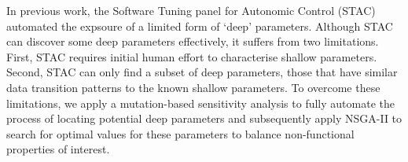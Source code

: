 In previous work, the Software Tuning panel for Autonomic Control 
(STAC)~\cite{Brake:2008:ADS:1370018.1370031} automated the expsoure of a
limited form of `deep' parameters. 
Although STAC
can discover some deep parameters effectively, it suffers from two
limitations. First, STAC requires initial human effort to characterise
shallow parameters. Second, STAC can only find a subset of deep parameters,
those that have similar data transition patterns to the known shallow
parameters. To overcome these limitations, we apply a mutation-based
sensitivity analysis to fully automate the process of locating potential
deep parameters and subsequently apply NSGA-II to search for optimal values
for these parameters to balance non-functional properties of interest. 
